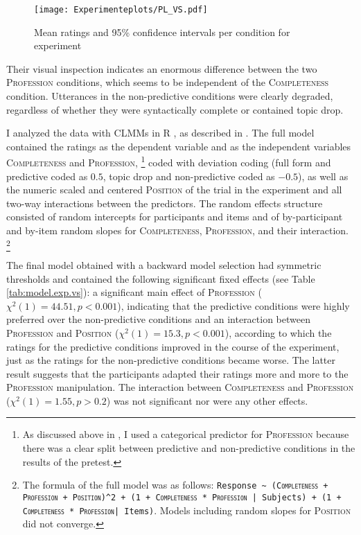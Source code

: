 \begin{figure}
\centering
\texttt{[image: Experimenteplots/PL\_VS.pdf]}
\caption{Mean ratings and 95\% confidence intervals per condition for experiment }
\label{fig:pl.vs} %
\end{figure}

Their visual inspection indicates an enormous difference between the two \textsc{Profession} conditions, which seems to be independent of the \textsc{Completeness} condition.
Utterances in the non-predictive conditions were clearly degraded, regardless of whether they were syntactically complete or contained topic drop.

I analyzed the data with CLMMs in R \citep{christensen2019}, as described in .
The full model contained the ratings as the dependent variable and as the independent variables \textsc{Completeness} and \textsc{Profession},%
\footnote{As discussed above in , I used a categorical predictor for \textsc{Profession} because there was a clear split between predictive and non-predictive conditions in the results of the pretest.}
%
coded with deviation coding (full form and predictive coded as $0.5$, topic drop and non-predictive coded as $-0.5$), as well as the numeric scaled and centered \textsc{Position} of the trial in the experiment and all two-way interactions between the predictors.
The random effects structure consisted of random intercepts for participants and items and of by-participant and by-item random slopes for \textsc{Completeness}, \textsc{Profession}, and their interaction.%
\footnote{The formula of the full model was as follows: \texttt{Response \textasciitilde\ (\textsc{Completeness} + \textsc{Profession} + \textsc{Position})\textasciicircum2 + (1 + \textsc{Completeness} * \textsc{Profession} | Subjects) + (1 + \textsc{Completeness} * \textsc{Profession}| Items)}.
Models including random slopes for \textsc{Position} did not converge.}

The final model obtained with a backward model selection had symmetric thresholds and contained the following significant fixed effects (see Table \ref{tab:model.exp.vs}):
a significant main effect of \textsc{Profession} ($\chi^2(1) = 44.51, p < 0.001$), indicating that the predictive conditions were highly preferred over the non-predictive conditions and an interaction between \textsc{Profession} and \textsc{Position} ($\chi^2(1) = 15.3, p < 0.001$), according to which the ratings for the predictive conditions improved in the course of the experiment, just as the ratings for the non-predictive conditions became worse.
The latter result suggests that the participants adapted their ratings more and more to the \textsc{Profession} manipulation.
The interaction between \textsc{Completeness} and \textsc{Profession} ($\chi^2(1) = 1.55, p > 0.2$) was not significant nor were any other effects.


